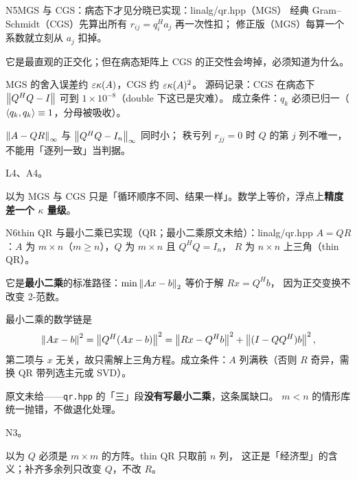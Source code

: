 \begin{know}{N5}{MGS 与 CGS：病态下才见分晓}{已实现：linalg/qr.hpp（MGS）}
 经典 Gram--Schmidt（CGS）先算出所有 $r_{ij}=q_i^{H}a_j$ 再一次性扣；
修正版（MGS）每算一个系数就立刻从 $a_j$ 扣掉。

 它是最直观的正交化；但在病态矩阵上 CGS 的正交性会垮掉，必须知道为什么。

 MGS 的舍入误差约 $\varepsilon\kappa(A)$，CGS 约 $\varepsilon\kappa(A)^{2}$。
源码记录：CGS 在病态下 $\left\lVert Q^{H}Q-I\right\rVert$ 可到 $1\times10^{-8}$（double 下这已是灾难）。
成立条件：$q_k$ 必须已归一（$\langle q_k,q_k\rangle\equiv1$，分母被吸收）。

 $\left\lVert A-QR\right\rVert_{\infty}$ 与 $\left\lVert Q^{H}Q-I_{n}\right\rVert_{\infty}$ 同时小；
秩亏列 $r_{jj}=0$ 时 $Q$ 的第 $j$ 列不唯一，不能用「逐列一致」当判据。

 L4、A4。

 以为 MGS 与 CGS 只是「循环顺序不同、结果一样」。数学上等价，浮点上\textbf{精度差一个 $\kappa$ 量级}。
\end{know}

\begin{know}{N6}{thin QR 与最小二乘}{已实现（QR；最小二乘原文未给）：linalg/qr.hpp}
 $A=QR$：$A$ 为 $m\times n$（$m\ge n$），$Q$ 为 $m\times n$ 且 $Q^{H}Q=I_n$，
$R$ 为 $n\times n$ 上三角（thin QR）。

 它是\textbf{最小二乘}的标准路径：$\min\left\lVert Ax-b\right\rVert_{2}$ 等价于解 $Rx=Q^{H}b$，
因为正交变换不改变 2-范数。

 最小二乘的数学链是
\[
\left\lVert Ax-b\right\rVert^{2}=\left\lVert Q^{H}(Ax-b)\right\rVert^{2}
=\left\lVert Rx-Q^{H}b\right\rVert^{2}+\left\lVert (I-QQ^{H})b\right\rVert^{2},
\]
第二项与 $x$ 无关，故只需解上三角方程。成立条件：$A$ 列满秩（否则 $R$ 奇异，需换 QR 带列选主元或 SVD）。

 原文未给——\texttt{qr.hpp} 的「三」段\textbf{没有写最小二乘}，这条属缺口。
$m<n$ 的情形库统一抛错，不做退化处理。

 N3。

 以为 $Q$ 必须是 $m\times m$ 的方阵。thin QR 只取前 $n$ 列，
这正是「经济型」的含义；补齐多余列只改变 $Q$，不改 $R$。
\end{know}

